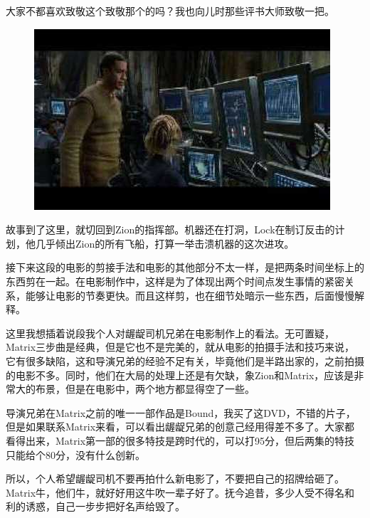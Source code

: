 \documentclass{ctexart}
\begin{document}
大家不都喜欢致敬这个致敬那个的吗？我也向儿时那些评书大师致敬一把。

\begin{figure}[htb]
\centering
\includegraphics[width=0.5\linewidth]{fig/read_reloaded-143}
\end{figure}

故事到了这里，就切回到Zion的指挥部。机器还在打洞，Lock在制订反击的计划，他几乎倾出Zion的所有飞船，打算一举击溃机器的这次进攻。

接下来这段的电影的剪接手法和电影的其他部分不太一样，是把两条时间坐标上的东西剪在一起。在电影制作中，这样是为了体现出两个时间点发生事情的紧密关系，能够让电影的节奏更快。而且这样剪，也在细节处暗示一些东西，后面慢慢解释。

这里我想插着说段我个人对龌龊司机兄弟在电影制作上的看法。无可置疑，Matrix三步曲是经典，但是它也不是完美的，就从电影的拍摄手法和技巧来说，它有很多缺陷，这和导演兄弟的经验不足有关，毕竟他们是半路出家的，之前拍摄的电影不多。同时，他们在大局的处理上还是有欠缺，象Zion和Matrix，应该是非常大的布景，但是在电影中，两个地方都显得空了一些。

导演兄弟在Matrix之前的唯一一部作品是Bound，我买了这DVD，不错的片子，但是如果联系Matrix来看，可以看出龌龊兄弟的创意己经用得差不多了。大家都看得出来，Matrix第一部的很多特技是跨时代的，可以打95分，但后两集的特技只能给个80分，没有什么创新。

所以，个人希望龌龊司机不要再拍什么新电影了，不要把自己的招牌给砸了。Matrix牛，他们牛，就好好用这牛吹一辈子好了。抚今追昔，多少人受不得名和利的诱惑，自己一步步把好名声给毁了。
\end{document}
